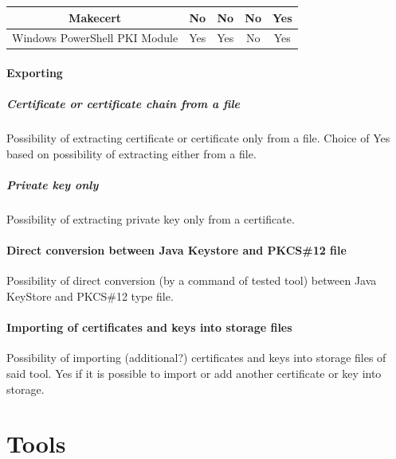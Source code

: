 \documentclass[10pt, a4paper]{report}
\begin{document}
{\begin{table}[h!]
\begin{adjustbox}{max width=\textwidth}
\begin{tabular}{|c|c|c|c|c|}
Makecert		      & \cellcolor[HTML]{FE0000}No	   & \cellcolor[HTML]{FE0000}No  & \cellcolor[HTML]{FE0000}No		   & \cellcolor[HTML]{34FF34}Yes				      \\ \hline
Windows PowerShell PKI Module & \cellcolor[HTML]{34FF34}Yes      & \cellcolor[HTML]{34FF34}Yes & \cellcolor[HTML]{FE0000}No              & \cellcolor[HTML]{34FF34}Yes                                      \\ \hline
\end{tabular}
\end{adjustbox}
\end{table}


\subsection{Exporting}

\subsubsection{Certificate or certificate chain from a file}
Possibility of extracting certificate or certificate only from a file. Choice of Yes based on possibility of extracting either from a file.

\subsubsection{Private key only}
Possibility of extracting private key only from a certificate.

\subsection{Direct conversion between Java Keystore and PKCS\#12 file}
Possibility of direct conversion (by a command of tested tool) between Java KeyStore and PKCS\#12 type file.

\subsection{Importing of certificates and keys into storage files}
Possibility of importing (additional?) certificates and keys into storage files of said tool. Yes if it is possible to import or add another certificate or key into storage.


\newpage
\part{Tools}

}
\end{document}
